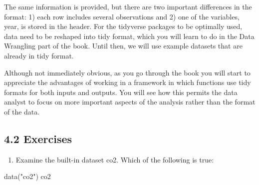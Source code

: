 \documentclass[
]{article}
\newenvironment{Shaded}{\begin{snugshade}}{\end{snugshade}}
\newcommand{\FunctionTok}[1]{\textcolor[rgb]{0.00,0.00,0.00}{#1}}
\newcommand{\NormalTok}[1]{#1}
\newcommand{\StringTok}[1]{\textcolor[rgb]{0.31,0.60,0.02}{#1}}
\providecommand{\tightlist}{%
  \setlength{\itemsep}{0pt}\setlength{\parskip}{0pt}}
\begin{document}
The same information is provided, but there are two important
differences in the format: 1) each row includes several observations and
2) one of the variables, year, is stored in the header. For the
tidyverse packages to be optimally used, data need to be reshaped into
tidy format, which you will learn to do in the Data Wrangling part of
the book. Until then, we will use example datasets that are already in
tidy format.

Although not immediately obvious, as you go through the book you will
start to appreciate the advantages of working in a framework in which
functions use tidy formats for both inputs and outputs. You will see how
this permits the data analyst to focus on more important aspects of the
analysis rather than the format of the data.

\hypertarget{exercises}{%
\subsection{4.2 Exercises}\label{exercises}}

\begin{enumerate}
\def\labelenumi{\arabic{enumi}.}
\tightlist
\item
  Examine the built-in dataset co2. Which of the following is true:
\end{enumerate}

\begin{Shaded}
\begin{Highlighting}[]
\FunctionTok{data}\NormalTok{(}\StringTok{"co2"}\NormalTok{)}
\NormalTok{co2}
\end{Highlighting}
\end{Shaded}
\end{document}
